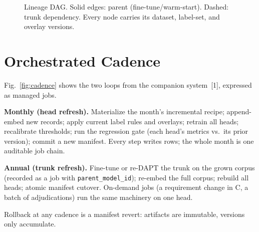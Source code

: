 \documentclass[conference]{IEEEtran}
\begin{document}
\begin{figure}[t]
\centering
{}
\caption{Lineage DAG. Solid edges: parent (fine-tune/warm-start). Dashed: trunk dependency. Every node carries its dataset, label-set, and overlay versions.}
\label{fig:dag}
\end{figure}

\section{Orchestrated Cadence}
Fig.~\ref{fig:cadence} shows the two loops from the companion system~[1], expressed as managed jobs.

\textbf{Monthly (head refresh).} Materialize the month's incremental recipe; append-embed new records; apply current label rules and overlays; retrain all heads; recalibrate thresholds; run the regression gate (each head's metrics vs.\ its prior version); commit a new manifest. Every step writes rows; the whole month is one auditable job chain.

\textbf{Annual (trunk refresh).} Fine-tune or re-DAPT the trunk on the grown corpus (recorded as a job with \texttt{parent\_model\_id}); re-embed the full corpus; rebuild all heads; atomic manifest cutover. On-demand jobs (a requirement change in C, a batch of adjudications) run the same machinery on one head.

Rollback at any cadence is a manifest revert: artifacts are immutable, versions only accumulate.
\end{document}
